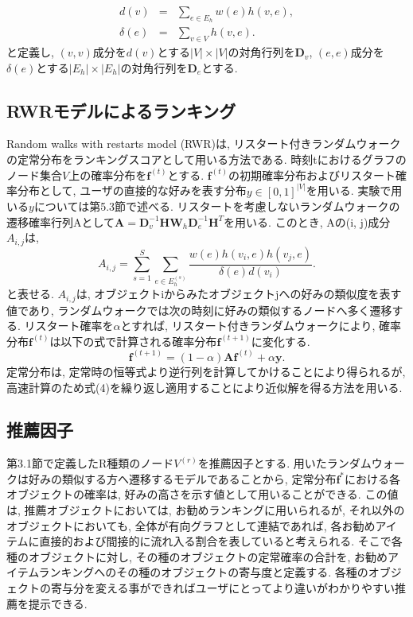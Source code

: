 \documentclass[a4j,11pt]{jarticle}           %
\begin{document}
	\begin{eqnarray}
	d(v)&=&\sum_{e\in E_h}w(e)h(v,e), \\ \delta(e)&=&\sum_{v\in V}h(v,e). 
	\end{eqnarray}
	と定義し, $(v, v)$成分を$d(v)$とする$|V|\times |V|$の対角行列を$\textbf{D}_v$, $(e, e)$成分を$\delta(e)$とする$|E_h|\times |E_h|$の対角行列を$\textbf{D}_e$とする.
	
	
	
	\subsection{RWRモデルによるランキング}
	Random walks with restarts model (RWR)\cite{rwr}は, リスタート付きランダムウォークの定常分布をランキングスコアとして用いる方法である. 時刻tにおけるグラフのノード集合$V$上の確率分布を$\textbf{f}^{(t)}$とする. $\textbf{f}^{(t)}$の初期確率分布およびリスタート確率分布として, ユーザの直接的な好みを表す分布$y\in[0,1]^{|V|}$を用いる. 実験で用いる$y$については第5.3節で述べる. リスタートを考慮しないランダムウォークの遷移確率行列Aとして$\textbf{A}=\textbf{D}_v^{-1}\textbf{H}\textbf{W}_h\textbf{D}_e^{-1}\textbf{H}^T$を用いる. このとき, Aの(i, j)成分$A_{i,j}$は, 
	\begin{equation}
	A_{i,j}=\sum_{s=1}^{S}\sum_{e\in E_h^{(s)}}\frac{w(e)h(v_i,e)h(v_j,e)}{\delta(e)d(v_i)}.
	\end{equation}
	と表せる. $A_{i,j}$は, オブジェクトiからみたオブジェクトjへの好みの類似度を表す値であり, ランダムウォークでは次の時刻に好みの類似するノードへ多く遷移する. リスタート確率を$\alpha$とすれば, リスタート付きランダムウォークにより, 確率分布$\textbf{f}^{(t)}$は以下の式で計算される確率分布$\textbf{f}^{(t+1)}$に変化する. 
	\begin{equation}
	\textbf{f}^{(t+1)}=(1-\alpha)\textbf{A}\textbf{f}^{(t)}+\alpha\textbf{y}.
	\end{equation}
	定常分布は, 定常時の恒等式より逆行列を計算してかけることにより得られるが, 高速計算のため式(4)を繰り返し適用することにより近似解を得る方法を用いる. 

	\subsection{推薦因子}
	第3.1節で定義したR種類のノード$V^{(r)}$を推薦因子とする. 用いたランダムウォークは好みの類似する方へ遷移するモデルであることから, 定常分布$\textbf{f}^*$における各オブジェクトの確率は, 好みの高さを示す値として用いることができる. この値は, 推薦オブジェクトにおいては, お勧めランキングに用いられるが, それ以外のオブジェクトにおいても, 全体が有向グラフとして連結であれば, 各お勧めアイテムに直接的および間接的に流れ入る割合を表していると考えられる. そこで各種のオブジェクトに対し, その種のオブジェクトの定常確率の合計を, お勧めアイテムランキングへのその種のオブジェクトの寄与度と定義する. 各種のオブジェクトの寄与分を変える事ができればユーザにとってより違いがわかりやすい推薦を提示できる.
	
\end{document}
